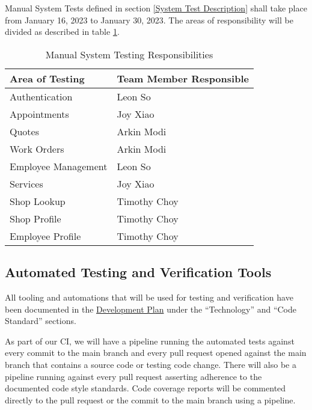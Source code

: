 \documentclass[12pt, titlepage]{article}
\begin{document}
Manual System Tests defined in section \ref{System Test Description} shall take place from January
16, 2023 to January 30, 2023. The areas of responsibility will be divided as described in table
\ref{Manual System Testing Responsibilities}.

\begin{table}[H]
	\centering
	\caption{Manual System Testing Responsibilities}
	\vspace{5pt}
	\begin{tabular}{|p{}|p{}|}
		\hline
		\textbf{Area of Testing} & \textbf{Team Member Responsible} \\
		\hline
		Authentication           & Leon So                          \\
		\hline
		Appointments             & Joy Xiao                         \\
		\hline
		Quotes                   & Arkin Modi                       \\
		\hline
		Work Orders              & Arkin Modi                       \\
		\hline
		Employee Management      & Leon So                          \\
		\hline
		Services                 & Joy Xiao                         \\
		\hline
		Shop Lookup              & Timothy Choy                     \\
		\hline
		Shop Profile             & Timothy Choy                     \\
		\hline
		Employee Profile         & Timothy Choy                     \\
		\hline
	\end{tabular}

	\label{Manual System Testing Responsibilities}
\end{table}

\subsection{Automated Testing and Verification Tools} \label{Automated Testing and Verification Tools}

All tooling and automations that will be used for testing and verification have been documented in
the
\href{https://github.com/arkinmodi/project-sayyara/blob/main/docs/DevelopmentPlan/DevelopmentPlan.pdf}{Development
	Plan} under the ``Technology'' and ``Code Standard'' sections.

As part of our CI, we will have a pipeline running the automated tests against every commit to the
main branch and every pull request opened against the main branch that contains a source code or
testing code change. There will also be a pipeline running against every pull request asserting
adherence to the documented code style standards. Code coverage reports will be commented directly
to the pull request or the commit to the main branch using a pipeline.
\end{document}
